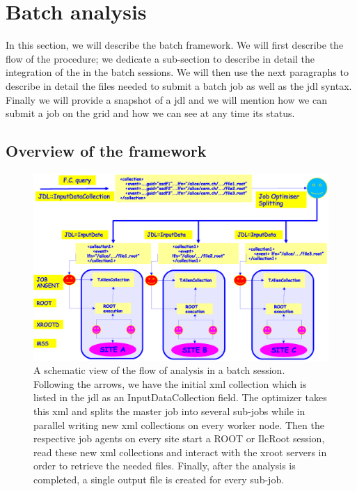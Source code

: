 \section{Batch analysis}
\label{Note:BATCH}

In this section, we will describe the batch framework. We will first describe the flow of the procedure; we dedicate a sub-section to describe in detail the integration of the \tag in the batch sessions. We will then use the next paragraphs to describe in detail the files needed to submit a batch job as well as the jdl syntax. Finally we will provide a snapshot of a jdl and we will mention how we can submit a job on the grid and how we can see at any time its status.

\subsection{Overview of the framework}

\begin{figure}[ht!]
\begin{center}
\includegraphics[height=0.5\textheight,width=0.7\textheight]{figures/Batch1.eps}
\end{center}
\caption{A schematic view of the flow of analysis in a batch session. Following the arrows, we have the initial xml collection which is listed in the jdl as an {\ttfamily InputDataCollection} field. The optimizer takes this xml and splits the master job into several sub-jobs while in parallel writing new xml collections on every worker node. Then the respective job agents on every site start a ROOT or IlcRoot session, read these new xml collections and interact with the xroot servers in order to retrieve the needed files. Finally, after the analysis is completed, a single output file is created for every sub-job.}
\label{Note:FigAnalsysisFlowBatch}
\end{figure}

